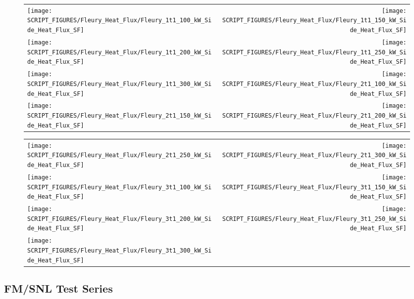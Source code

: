 \begin{figure}[p]
\begin{tabular*}{\textwidth}{l@{\extracolsep{\fill}}r}
\texttt{[image: SCRIPT\_FIGURES/Fleury\_Heat\_Flux/Fleury\_1t1\_100\_kW\_Side\_Heat\_Flux\_SF]} &
\texttt{[image: SCRIPT\_FIGURES/Fleury\_Heat\_Flux/Fleury\_1t1\_150\_kW\_Side\_Heat\_Flux\_SF]} \\
\texttt{[image: SCRIPT\_FIGURES/Fleury\_Heat\_Flux/Fleury\_1t1\_200\_kW\_Side\_Heat\_Flux\_SF]} &
\texttt{[image: SCRIPT\_FIGURES/Fleury\_Heat\_Flux/Fleury\_1t1\_250\_kW\_Side\_Heat\_Flux\_SF]} \\
\texttt{[image: SCRIPT\_FIGURES/Fleury\_Heat\_Flux/Fleury\_1t1\_300\_kW\_Side\_Heat\_Flux\_SF]} &
\texttt{[image: SCRIPT\_FIGURES/Fleury\_Heat\_Flux/Fleury\_2t1\_100\_kW\_Side\_Heat\_Flux\_SF]} \\
\texttt{[image: SCRIPT\_FIGURES/Fleury\_Heat\_Flux/Fleury\_2t1\_150\_kW\_Side\_Heat\_Flux\_SF]} &
\texttt{[image: SCRIPT\_FIGURES/Fleury\_Heat\_Flux/Fleury\_2t1\_200\_kW\_Side\_Heat\_Flux\_SF]}
\end{tabular*}
\end{figure}

\begin{figure}[p]
\begin{tabular*}{\textwidth}{l@{\extracolsep{\fill}}r}
\texttt{[image: SCRIPT\_FIGURES/Fleury\_Heat\_Flux/Fleury\_2t1\_250\_kW\_Side\_Heat\_Flux\_SF]} &
\texttt{[image: SCRIPT\_FIGURES/Fleury\_Heat\_Flux/Fleury\_2t1\_300\_kW\_Side\_Heat\_Flux\_SF]} \\
\texttt{[image: SCRIPT\_FIGURES/Fleury\_Heat\_Flux/Fleury\_3t1\_100\_kW\_Side\_Heat\_Flux\_SF]} &
\texttt{[image: SCRIPT\_FIGURES/Fleury\_Heat\_Flux/Fleury\_3t1\_150\_kW\_Side\_Heat\_Flux\_SF]} \\
\texttt{[image: SCRIPT\_FIGURES/Fleury\_Heat\_Flux/Fleury\_3t1\_200\_kW\_Side\_Heat\_Flux\_SF]} &
\texttt{[image: SCRIPT\_FIGURES/Fleury\_Heat\_Flux/Fleury\_3t1\_250\_kW\_Side\_Heat\_Flux\_SF]} \\
\texttt{[image: SCRIPT\_FIGURES/Fleury\_Heat\_Flux/Fleury\_3t1\_300\_kW\_Side\_Heat\_Flux\_SF]}
\end{tabular*}
\end{figure}

\clearpage

\subsection{FM/SNL Test Series}

